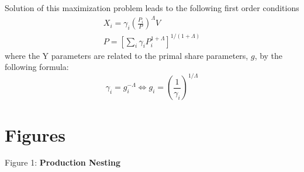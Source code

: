\documentclass{article}
\begin{document}
Solution of this maximization problem leads to the following first order conditions
$$
\begin{gathered}
X_{i}=\gamma_{i}\left(\frac{P_{i}}{P}\right)^{\Lambda} V \\
P=\left[\sum_{i} \gamma_{i} P_{i}^{1+\Lambda}\right]^{1 /(1+\Lambda)}
\end{gathered}
$$
where the Y parameters are related to the primal share parameters, $g$, by the following formula:
$$
\gamma_{i}=g_{i}^{-\Lambda} \Leftrightarrow g_{i}=\left(\frac{1}{\gamma_{i}}\right)^{1 / \Lambda}
$$

\newpage
\section*{Figures}
\begin{center}

Figure 1:\textbf{ Production Nesting}


\begin{scriptsize}
\begin{tikzpicture}


\end{tikzpicture}
\end{scriptsize}
\end{center}
\end{document}
